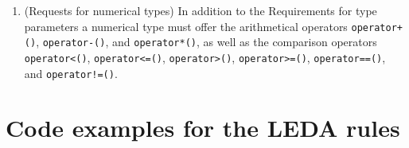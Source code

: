 \begin{enumerate}
\item 


 (Requests for numerical types)
In addition to the
Requirements for type parameters 
a numerical type must offer the arithmetical operators
\verb$operator+()$,
\verb$operator-()$, and \verb$operator*()$,
as well as the comparison operators
\verb$operator<()$,
\verb$operator<=()$,
\verb$operator>()$,
\verb$operator>=()$,
\verb$operator==()$, and
\verb$operator!=()$.



      





    
\end{enumerate}





    
      \section{Code examples for the LEDA rules}\label{rules-exp}


